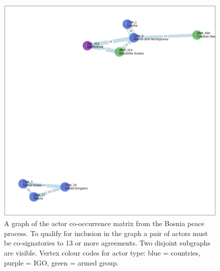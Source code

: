 \documentclass{article}
\begin{document}
\begin{figure}[H]
\begin{center}
\includegraphics[scale=0.50]{./assets/bosnia_actors.png}
\end{center}
\caption{A graph of the actor co-occurrence matrix from the Bosnia peace process. To qualify for inclusion in the graph a pair of actors must be co-signatories to 13 or more agreements. Two disjoint subgraphs are visible. Vertex colour codes for actor type: blue = countries,  purple = IGO, green = armed group.}
\end{figure}
\end{document}
